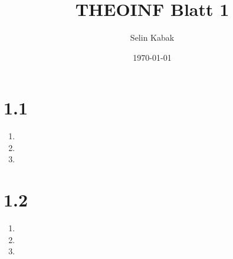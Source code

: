 \documentclass{article}
\title{THEOINF Blatt 1}
\author{Selin Kabak}
\date\today
\begin{document}
\maketitle
\section*{1.1}
    \begin{enumerate}
        \item
        \item
        \item
        \end{enumerate}
\clearpage
\section*{1.2}
    \begin{enumerate}
        \item
        \item
        \item
    \end{enumerate}
\end{document}
